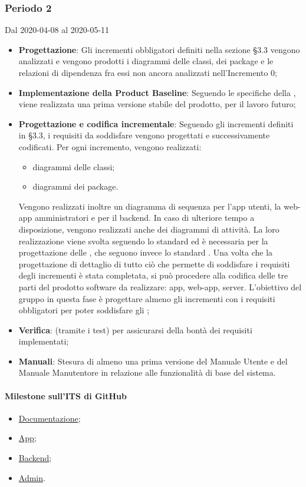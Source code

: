 \subsubsection{Periodo 2} 
Dal 2020-04-08 al 2020-05-11
\begin{itemize}
	\item \textbf{Progettazione}: Gli incrementi obbligatori definiti nella sezione §3.3 vengono analizzati e vengono prodotti i diagrammi delle classi, dei package e le relazioni di dipendenza fra essi non ancora analizzati nell'Incremento 0;
	\item \textbf{Implementazione della Product Baseline}: Seguendo le specifiche della , viene realizzata una prima versione stabile del prodotto,  per il lavoro futuro;
	\item \textbf{Progettazione e codifica incrementale}: Seguendo gli incrementi definiti in §3.3, i requisiti da soddisfare vengono progettati e successivamente codificati. Per ogni incremento, vengono realizzati:
	\begin{itemize}
		\item diagrammi delle classi;
		\item diagrammi dei package.
	\end{itemize}
	Vengono realizzati inoltre un diagramma di sequenza per l'app utenti, la web-app amministratori e per il backend. In caso di ulteriore tempo a disposizione, vengono realizzati anche dei diagrammi di attività.
	La loro realizzazione viene svolta seguendo lo standard  ed è necessaria per la progettazione delle , che seguono invece lo standard .
	Una volta che la progettazione di dettaglio di tutto ciò che permette di soddisfare i requisiti degli incrementi è stata completata, si può procedere alla codifica delle tre parti del prodotto software da realizzare: app, web-app, server.
	L'obiettivo del gruppo in questa fase è progettare almeno gli incrementi con i requisiti obbligatori per poter soddisfare gli ;
	\item \textbf{Verifica}:  (tramite i test) per assicurarsi della bontà dei requisiti implementati;
	\item \textbf{Manuali}: Stesura di almeno una prima versione del Manuale Utente e del Manuale Manutentore in relazione alle funzionalità di base del sistema.
\end{itemize}
\paragraph{Milestone sull'ITS di GitHub}
\begin{itemize}
	\item \href{https://github.com/qb-team/Stalker-Documentazione/milestone/12}{Documentazione};
	\item \href{https://github.com/qb-team/Stalker-App/milestone/2}{App};
	\item \href{https://github.com/qb-team/Stalker-Backend/milestone/2}{Backend};
	\item \href{https://github.com/qb-team/Stalker-Admin/milestone/2}{Admin}.
\end{itemize}

